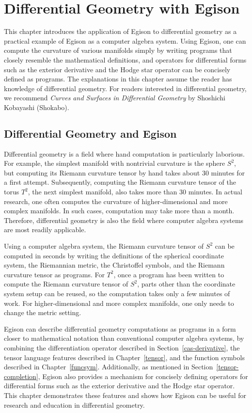 \chapter{Differential Geometry with Egison}\label{diffgeo}

This chapter introduces the application of Egison to differential geometry as a practical example of Egison as a computer algebra system.
Using Egison, one can compute the curvature of various manifolds simply by writing programs that closely resemble the mathematical definitions, and operators for differential forms such as the exterior derivative and the Hodge star operator can be concisely defined as programs.
The explanations in this chapter assume the reader has knowledge of differential geometry.
For readers interested in differential geometry, we recommend \textit{Curves and Surfaces in Differential Geometry} by Shoshichi Kobayashi (Shokabo).

\section{Differential Geometry and Egison}

Differential geometry is a field where hand computation is particularly laborious.
For example, the simplest manifold with nontrivial curvature is the sphere $S^2$, but computing its Riemann curvature tensor by hand takes about 30 minutes for a first attempt.
Subsequently, computing the Riemann curvature tensor of the torus $T^2$, the next simplest manifold, also takes more than 30 minutes.
In actual research, one often computes the curvature of higher-dimensional and more complex manifolds.
In such cases, computation may take more than a month.
Therefore, differential geometry is also the field where computer algebra systems are most readily applicable.

Using a computer algebra system, the Riemann curvature tensor of $S^2$ can be computed in seconds by writing the definitions of the spherical coordinate system, the Riemannian metric, the Christoffel symbols, and the Riemann curvature tensor as programs.
For $T^2$, once a program has been written to compute the Riemann curvature tensor of $S^2$, parts other than the coordinate system setup can be reused, so the computation takes only a few minutes of work.
For higher-dimensional and more complex manifolds, one only needs to change the metric setting.

Egison can describe differential geometry computations as programs in a form closer to mathematical notation than conventional computer algebra systems, by combining the differentiation operator described in Section~\ref{cas-derivative}, the tensor language features described in Chapter~\ref{tensor}, and the function symbols described in Chapter~\ref{funcsym}.
Additionally, as mentioned in Section~\ref{tensor-completion}, Egison also provides a mechanism for concisely defining operators for differential forms such as the exterior derivative and the Hodge star operator.
This chapter demonstrates these features and shows how Egison can be useful for research and education in differential geometry.

